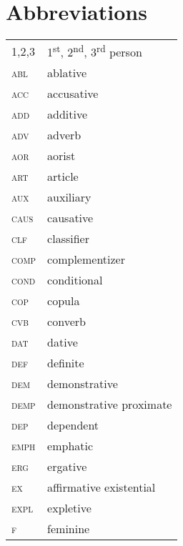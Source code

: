 \documentclass[output=paper,colorlinks,citecolor=brown]{langscibook}
\begin{document}
\section*{Abbreviations}
\begin{tabularx}{.45\textwidth}{lQ}
1,2,3 & 1\textsuperscript{st}, 2\textsuperscript{nd}, 3\textsuperscript{rd} person \\
\textsc{abl} & ablative\\
\textsc{acc} & accusative\\
\textsc{add} & additive\\
\textsc{adv} & adverb\\
\textsc{aor} & aorist\\
\textsc{art} & article\\
\textsc{aux} & auxiliary\\
\textsc{caus} & causative\\
\textsc{clf} & classifier\\
\textsc{comp} & complementizer\\
\textsc{cond} & conditional\\
\textsc{cop} & copula\\
\textsc{cvb} & converb\\
\textsc{dat} & dative\\
\textsc{def} & definite\\
\textsc{dem} & demonstrative\\
\textsc{demp} & demonstrative proximate\\
\textsc{dep} & dependent\\
\textsc{emph} & emphatic\\
\textsc{erg} & ergative\\
\textsc{ex} & affirmative existential\\
\textsc{expl} & expletive\\
\textsc{f} & feminine\\
\end{tabularx}
\end{document}
